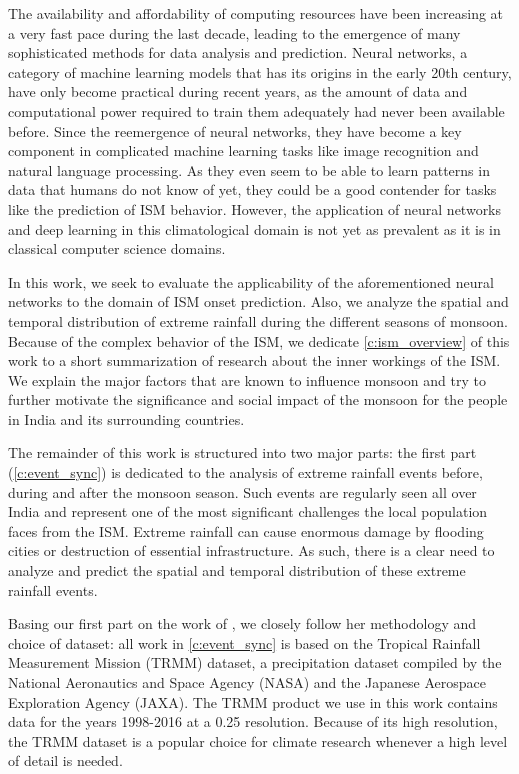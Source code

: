 The availability and affordability of computing resources have been increasing at a very fast pace during the last decade, leading to the emergence of many sophisticated methods for data analysis and prediction. Neural networks, a category of machine learning models that has its origins in the early 20th century, have only become practical during recent years, as the amount of data and computational power required to train them adequately had never been available before. Since the reemergence of neural networks, they have become a key component in complicated machine learning tasks like image recognition and natural language processing. As they even seem to be able to learn patterns in data that humans do not know of yet, they could be a good contender for tasks like the prediction of ISM behavior. However, the application of neural networks and deep learning in this climatological domain is not yet as prevalent as it is in classical computer science domains.

In this work, we seek to evaluate the applicability of the aforementioned neural networks to the domain of ISM onset prediction. Also, we analyze the spatial and temporal distribution of extreme rainfall during the different seasons of monsoon. Because of the complex behavior of the ISM, we dedicate \cref{c:ism_overview} of this work to a short summarization of research about the inner workings of the ISM. We explain the major factors that are known to influence monsoon and try to further motivate the significance and social impact of the monsoon for the people in India and its surrounding countries.

The remainder of this work is structured into two major parts: the first part (\cref{c:event_sync}) is dedicated to the analysis of extreme rainfall events before, during and after the monsoon season. Such events are regularly seen all over India and represent one of the most significant challenges the local population faces from the ISM. Extreme rainfall can cause enormous damage by flooding cities or destruction of essential infrastructure. As such, there is a clear need to analyze and predict the spatial and temporal distribution of these extreme rainfall events.

Basing our first part on the work of \citet{Stolbova.2015}, we closely follow her methodology and choice of dataset: all work in \cref{c:event_sync} is based on the Tropical Rainfall Measurement Mission (TRMM) dataset, a precipitation dataset compiled by the National Aeronautics and Space Agency (NASA) and the Japanese Aerospace Exploration Agency (JAXA). The TRMM product we use in this work contains data for the years 1998-2016 at a {0.25\degree} resolution. Because of its high resolution, the TRMM dataset is a popular choice for climate research whenever a high level of detail is needed.


